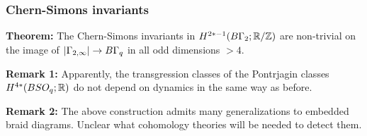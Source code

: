 \documentclass{beamer}
\begin{document}
     
\frame
{
  \frametitle{Chern-Simons invariants}
  
{\bf Theorem:} 
 The Chern-Simons invariants in $H^{2*-1}(B\Gamma_2 ; {\mathbb R}/{\mathbb Z})$ are non-trivial on the image of  $| \Gamma_{2,\infty}| \to B\Gamma_q$   in all odd dimensions $> 4$.

\bigskip
\pause
 
 {\bf Remark 1:} Apparently, the transgression classes of the Pontrjagin classes  $H^{4*}(BSO_q ; {\mathbb R})$ do not 
 depend on dynamics in the same way as before. 
 
 \bigskip
\pause

 
  {\bf Remark 2:}  The above construction admits many generalizations to embedded braid diagrams. Unclear what cohomology theories will be needed to detect them.
 
  \vfill
  
}
  


 
\end{document}
